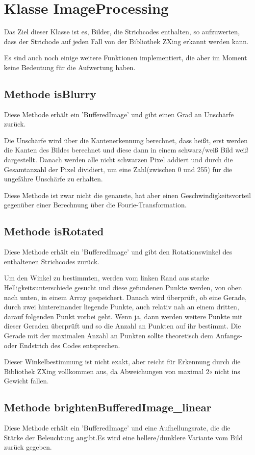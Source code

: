 \section{Klasse ImageProcessing}
Das Ziel dieser Klasse ist es, Bilder, die Strichcodes enthalten, so aufzuwerten, dass der Strichode auf jeden Fall von der Bibliothek ZXing erkannt werden kann.

Es sind auch noch einige weitere Funktionen implementiert, die aber im Moment keine Bedeutung für die Aufwertung haben.


\subsection*{Methode isBlurry}
Diese Methode erhält ein 'BufferedImage' und gibt einen Grad an Unschärfe zurück.

Die Unschärfe wird über die Kantenerkennung berechnet, dass heißt, erst werden die Kanten des Bildes berechnet und diese dann in einem schwarz/weiß Bild weiß dargestellt. Danach werden alle nicht schwarzen Pixel addiert und durch die Gesamtanzahl der Pixel dividiert, um eine Zahl(zwischen 0 und 255) für die ungefähre Unschärfe zu erhalten.

Diese Methode ist zwar nicht die genauste, hat aber einen Geschwindigkeitsvorteil gegenüber einer Berechnung über die Fourie-Transformation.


\subsection*{Methode isRotated}
Diese Methode erhält ein 'BufferedImage' und gibt den Rotationswinkel des enthaltenen Strichcodes zurück.

Um den Winkel zu bestimmten, werden vom linken Rand aus starke Helligkeitsunterschiede gesucht und diese gefundenen Punkte werden, von oben nach unten, in einem Array gespeichert. Danach wird überprüft, ob eine Gerade, durch zwei hintereinander liegende Punkte, auch relativ nah an einem dritten, darauf folgenden Punkt vorbei geht. Wenn ja, dann werden weitere Punkte mit dieser Geraden überprüft und so die Anzahl an Punkten auf ihr bestimmt. Die Gerade mit der maximalen Anzahl an Punkten sollte theoretisch dem Anfangs- oder Endstrich des Codes entsprechen.

Dieser Winkelbestimmung ist nicht exakt, aber reicht für Erkennung durch die Bibliothek ZXing vollkommen aus, da Abweichungen von maximal 2$ \circ $ nicht ins Gewicht fallen.
 

\subsection*{Methode brightenBufferedImage\_linear}
Diese Methode erhält ein 'BufferedImage' und eine Aufhellungsrate, die die Stärke der Beleuchtung angibt.Es wird eine hellere/dunklere Variante vom Bild zurück gegeben.

